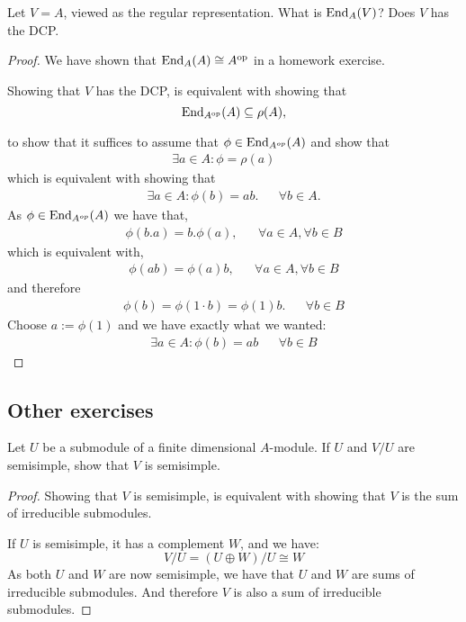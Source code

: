 \begin{prop}
Let \(V=A\), viewed as the regular representation. What is \(\operatorname{End}_A(V)\)? Does \(V\) has the DCP.
\end{prop}

\begin{proof}
We have shown that \(\operatorname{End}_A(A)\cong A^{\operatorname{op}}\) in a homework exercise.

Showing that \(V\) has the DCP, is equivalent with showing that
\[
\operatorname{End}_{A^{\operatorname{op}}}(A)\subseteq \rho (A),
\]

to show that it suffices to assume that \(\phi \in \operatorname{End}_{A^{op}}(A)\) and show that
\begin{align*}
\exists a\in A: \phi =\rho (a) && 
\end{align*}
which is equivalent with showing that
\begin{align*}
\exists a\in A: \phi (b)=ab.&&\forall b\in A.
\end{align*}
As \(\phi \in \operatorname{End}_{A^{op}}(A)\) we have that,
\begin{align*}
\phi (b.a)=b.\phi (a), &&\forall a\in A,\forall b\in B
\end{align*}
which is equivalent with,
\begin{align*}
\phi (ab)=\phi (a)b, &&\forall a\in A,\forall b\in B
\end{align*}
and therefore
\begin{align*}
\phi (b)=\phi (1\cdot b)=\phi (1)b. &&\forall b\in B
\end{align*}
Choose \(a:=\phi (1)\) and we have exactly what we wanted:
\begin{align*}
\exists a\in A: \phi (b)=ab && \forall b\in B
\end{align*}
\end{proof}

\subsection{Other exercises}

\begin{prop}
Let \(U\) be a submodule of a finite dimensional \(A\)-module. If \(U\) and \(V/U\) are semisimple, show that \(V\) is semisimple.
\end{prop}

\begin{proof}
Showing that \(V\) is semisimple, is equivalent with showing that \(V\) is the sum of irreducible submodules.

If \(U\) is semisimple, it has a complement \(W\), and we have:
\[
V/U=(U\oplus W)/U \cong W
\]
As both \(U\) and \(W\) are now semisimple, we have that \(U\) and \(W\) are sums of irreducible submodules. And therefore \(V\) is also a sum of irreducible submodules.
\end{proof}



